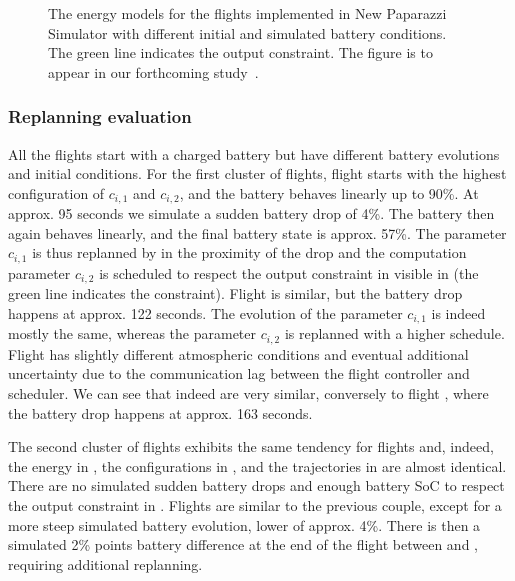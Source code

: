 \begin{figure}[p!]
  \centering
  \selectfont
  \footnotesize    
  
  \caption[The energy models for the flights implemented in NPS]{The energy models for the flights implemented in New Paparazzi Simulator with different initial and simulated battery conditions. The green line indicates the output constraint. The figure is to appear in our forthcoming study~\citep{seewald202Xenergy}.}
  \label{fig:ener-pprz}
\end{figure}

\subsubsection*{Replanning evaluation}

All the flights start with a charged battery but have different battery evolutions and initial conditions. For the first cluster of flights, flight  starts with the highest configuration of $c_{i,1}$ and $c_{i,2}$, and the battery behaves linearly up to 90\%. At approx. 95 seconds we simulate a sudden battery drop of 4\%. The battery then again behaves linearly, and the final battery state is approx. 57\%. The parameter $c_{i,1}$ is thus replanned by  in the proximity of the drop and the computation parameter $c_{i,2}$ is scheduled to respect the output constraint in  visible in  (the green line indicates the constraint). Flight  is similar, but the battery drop happens at approx. 122 seconds. The evolution of the parameter $c_{i,1}$ is indeed mostly the same, whereas the parameter $c_{i,2}$ is replanned with a higher schedule. Flight  has slightly different atmospheric conditions and eventual additional uncertainty due to the communication lag between the flight controller and scheduler. We can see that indeed  are very similar, conversely to flight , where the battery drop happens at approx. 163 seconds.

The second cluster of flights exhibits the same tendency for flights  and, indeed, the energy in , the configurations in , and the trajectories in  are almost identical. There are no simulated sudden battery drops and enough battery SoC to respect the output constraint in . Flights  are similar to the previous couple, except for a more steep simulated battery evolution, lower of approx. 4\%. There is then a simulated 2\% points battery difference at the end of the flight between  and , requiring additional replanning.

